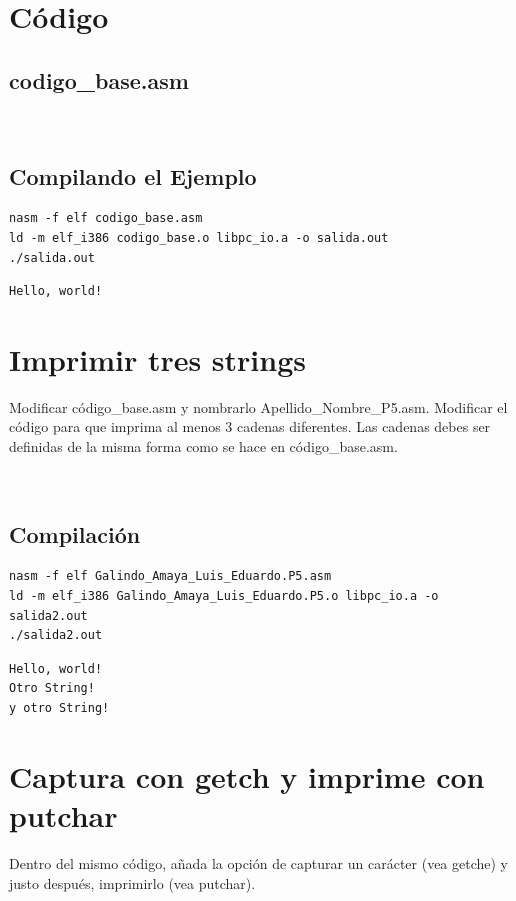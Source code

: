 \documentclass[12pt]{article}
\begin{document}
\section*{Código}
\label{sec:orgfba8732}
\subsection*{codigo\_base.asm}
\label{sec:org26ddb9a}
\\ 

\subsection*{Compilando el Ejemplo}
\label{sec:orge6403eb}
\begin{verbatim}
nasm -f elf codigo_base.asm
ld -m elf_i386 codigo_base.o libpc_io.a -o salida.out
./salida.out 
\end{verbatim}

\begin{verbatim}
Hello, world!
\end{verbatim}

\pagebreak

\section*{Imprimir tres strings}
\label{sec:org24a4f4f}
Modificar código\_base.asm y nombrarlo Apellido\_Nombre\_P5.asm. Modificar el código para que imprima al menos 3 cadenas diferentes. Las cadenas debes ser definidas de la misma forma como se hace en código\_base.asm.

\\ 

\subsection*{Compilación}
\label{sec:orga4156cb}
\begin{verbatim}
nasm -f elf Galindo_Amaya_Luis_Eduardo.P5.asm
ld -m elf_i386 Galindo_Amaya_Luis_Eduardo.P5.o libpc_io.a -o salida2.out
./salida2.out 
\end{verbatim}

\begin{verbatim}
Hello, world!
Otro String!
y otro String!
\end{verbatim}

\pagebreak

\section*{Captura con getch y imprime con putchar}
\label{sec:orgda25ae3}
Dentro del mismo código, añada la opción de capturar un carácter (vea getche) y justo después, imprimirlo (vea putchar).
\end{document}
